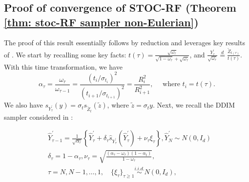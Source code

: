 \documentclass{article}
\theoremstyle{plain}
\theoremstyle{definition}
\theoremstyle{remark}
\newcommand{\bc}[1]{\left\{{#1}\right\}}
\begin{document}
\subsection{Proof of convergence of STOC-RF (Theorem \ref{thm: stoc-RF sampler non-Eulerian})}
\label{app: Stoc-RF convergence}
The proof of this result essentially follows by reduction and leverages key results of \cite{liang2025low}. We start by recalling some key facts:
 $t(\tau) = \frac{\sqrt{\omega_\tau}}{\sqrt{1 - \omega_\tau} + \sqrt{\omega_\tau}}$, and $\frac{Y^\prime_\tau}{\sqrt{\omega_\tau}} \overset{d}{=} \frac{\tilde Z_{t(\tau)}}{t(\tau)}$. With this time transformation, we have 
 \begin{equation}
 \label{eq: alpha_t expression stoc-RF}
 \alpha_\tau = \frac{\omega_\tau}{\omega_{\tau -1}} = \frac{(t_i/ \sigma_{t_i})^2}{(t_{i+1}/\sigma_{t_{i+1}})^2} = \frac{R_i^2}{R_{i+1}^2}, \quad \text{ where $t_i = t(\tau)$}.
 \end{equation}
 We also have $s_{Y^\prime_\tau }(y) = \sigma_t s_{\tilde Z_t}(\tilde z)$, where $\tilde z = \sigma_t y$.
 Next, we recall the DDIM sampler considered in \citet{liang2025low}:  

\begin{equation}
    \label{eq: DDPM sampler liang2025 2}
    \begin{aligned}
    & \hat Y^\prime_{\tau -1} = \frac{1}{\sqrt{\alpha_\tau}} \bc{ \hat Y^\prime_\tau + \delta_\tau \widehat s_{Y^\prime_\tau}(\hat Y^\prime_\tau) + \nu_\tau \xi_\tau}, \hat Y^\prime_N \sim N(0, I_d)\\
    & \delta_\tau = 1 - \alpha_\tau,  \nu_\tau = \sqrt{\frac{(\alpha_\tau - \omega_\tau)(1 - \alpha_t)}{1 - \omega_\tau}},\\
    & \tau   = N , N-1, \ldots, 1, \quad \{\xi_\tau\}_{\tau \ge 1} \overset{i.i.d.}{\sim} N(0,I_d),
    \end{aligned}
\end{equation}
\end{document}
